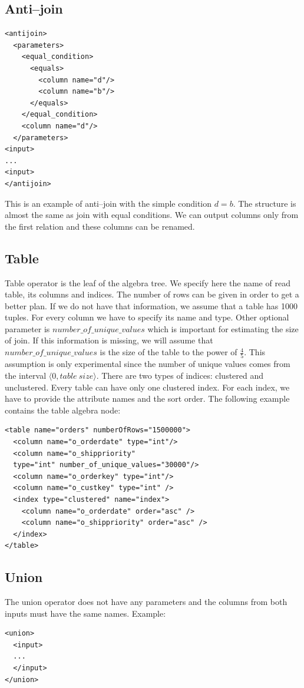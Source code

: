 \subsection{Anti--join}

\begin{lstlisting}
<antijoin>
  <parameters>
    <equal_condition>
      <equals>
        <column name="d"/>
        <column name="b"/>
      </equals>
    </equal_condition>
    <column name="d"/>
  </parameters>
<input>
...
<input>
</antijoin>
\end{lstlisting}

This is an example of anti--join with the simple condition $d=b$. The structure is almost the same as join with equal conditions. We can output columns only from the first relation and these columns can be renamed.
\\
\subsection{Table}
Table operator is the leaf of the algebra tree. We specify here the name of read table, its columns and indices. The number of rows can be given in order to get a better plan. If we do not have that information, we assume that a table has 1000 tuples. For every column we have to specify its name and type. Other optional parameter is $number\_of\_unique\_values$ which is important for estimating the size of join. If this information is missing, we will assume that $number\_of\_unique\_values$ is the size of the table to the power of $\frac{4}{5}$. This assumption is only experimental since the number of unique values comes from the interval $\langle 0, table~size\rangle$. There are two types of indices: clustered and  unclustered. Every table can have only one clustered index. For each index, we have to provide the attribute names and the sort order. The following example contains the table algebra node:
 
\begin{lstlisting}
<table name="orders" numberOfRows="1500000">
  <column name="o_orderdate" type="int"/>
  <column name="o_shippriority" 
  type="int" number_of_unique_values="30000"/>
  <column name="o_orderkey" type="int"/>
  <column name="o_custkey" type="int" />
  <index type="clustered" name="index">
    <column name="o_orderdate" order="asc" />
    <column name="o_shippriority" order="asc" />
  </index>
</table>
\end{lstlisting}

\subsection{Union}
The union operator does not have any parameters and the columns from both inputs must have the same names. Example:
\begin{lstlisting}
<union>
  <input>
  ...
  </input>
</union>
\end{lstlisting}

